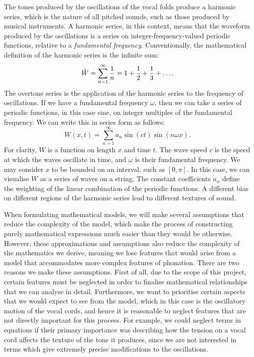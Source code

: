\documentclass{report}
\begin{document}
The tones produced by the oscillations of the vocal folds produce a harmonic series,
which is the nature of all pitched sounds, such as those produced by musical instruments.
A harmonic series, in this context,
means that the waveform produced by the oscillations is a series on integer-frequency-valued periodic functions,
relative to a \textit{fundamental frequency}.
Conventionally, the mathematical definition of the harmonic series is the infinite sum:
\begin{equation*}
    \hat{W} = \sum_{n=1}^{\infty}\frac{1}{n} = 1 + \frac{1}{2} + \frac{1}{3} + \mathellipsis.
\end{equation*}
The overtone series is the application of the harmonic series to the frequency of oscillations.
If we have a fundamental frequency $\omega$, then we can take a series of periodic functions, in this case sine,
on integer multiples of the fundamental frequency.
We can write this in series form as follows:
\begin{equation*}
    W(x,t) = \sum_{n=1}^{\infty}a_n \sin(ct) \sin(n \omega x).
\end{equation*}
For clarity, $W$ is a function on length $x$ and time $t$.
The wave speed $c$ is the speed at which the waves oscillate in time,
and $\omega$ is their fundamental frequency.
We may consider $x$ to be bounded on an interval, such as $[0, \pi]$.
In this case, we can visualise $W$ as a series of waves on a string.
The constant coefficients $a_n$ define the weighting of the linear combination of the periodic functions.
A different bias on different regions of the harmonic series lead to different textures of sound.

When formulating mathematical models,
we will make several assumptions that reduce the complexity of the model,
which make the process of constructing purely mathematical expressions much easier than they would be otherwise.
However, these approximations and assumptions also reduce the complexity of the mathematics we derive,
meaning we lose features that would arise from a model that accommodates more complex features of phonation.
There are two reasons we make these assumptions.
First of all, due to the scope of this project,
certain features must be neglected in order to finalise mathematical relationships that we can analyse in detail.
Furthermore, we want to prioritise certain aspects that we would expect to see from the model,
which in this case is the oscillatory motion of the vocal cords,
and hence it is reasonable to neglect features that are not directly important for this process.
For example, we could neglect terms in equations if their primary importance was describing how the tension on a vocal cord affects the texture of the tone it produces,
since we are not interested in terms which give extremely precise modifications to the oscillations.
\end{document}

